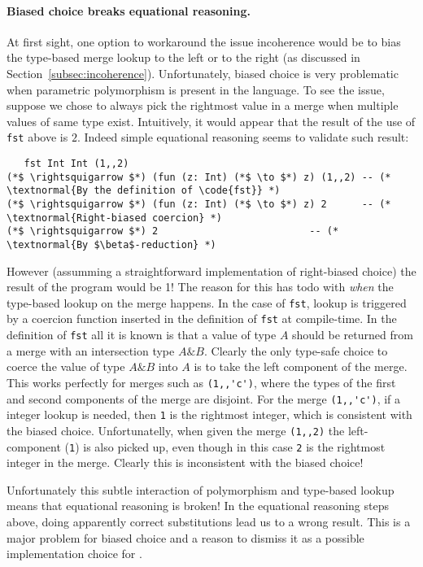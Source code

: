 \paragraph{Biased choice breaks equational reasoning.} At first sight, one option
to workaround the issue incoherence would be to bias the type-based merge lookup
to the left or to the right (as discussed in
Section~\ref{subsec:incoherence}). Unfortunately, biased choice is
very problematic when parametric polymorphism is present in the language.
To see the issue, suppose we chose to always pick the
rightmost value in a merge when multiple values of same type exist.
Intuitively, it would appear that the result of the use of
\lstinline{fst} above is $2$. Indeed simple equational reasoning
seems to validate such result:
\begin{lstlisting}
   fst Int Int (1,,2)
(*$ \rightsquigarrow $*) (fun (z: Int) (*$ \to $*) z) (1,,2) -- (* \textnormal{By the definition of \code{fst}} *)
(*$ \rightsquigarrow $*) (fun (z: Int) (*$ \to $*) z) 2      -- (* \textnormal{Right-biased coercion} *)
(*$ \rightsquigarrow $*) 2                          -- (* \textnormal{By $\beta$-reduction} *)
\end{lstlisting}

However (assumming a straightforward implementation of right-biased
choice) the result of the program would be 1! The reason for this has
todo with \emph{when} the type-based lookup on the merge happens. In
the case of \lstinline{fst}, lookup is triggered by a coercion
function inserted in the definition of \lstinline{fst} at
compile-time.
In the definition of \lstinline$fst$ all it is known is that a
value of type $A$ should be returned from a merge with an intersection
type $A\&B$.  Clearly the only type-safe choice to coerce the value of
type $A\&B$ into $A$ is to
take the left component of the merge. This works perfectly for merges
such as \lstinline$(1,,'c')$, where the types of the first and second components
of the merge are disjoint. For the merge \lstinline$(1,,'c')$, if a integer lookup
is needed, then \lstinline$1$ is the rightmost integer, which is consistent with the
biased choice. Unfortunatelly, when given the merge \lstinline$(1,,2)$ the
left-component (\lstinline$1$) is also picked up, even though in this case \lstinline$2$
is the rightmost integer in the merge. Clearly this is inconsistent
with the biased choice!

Unfortunately this subtle interaction of polymorphism and type-based lookup
 means that equational reasoning is broken!
In the equational reasoning steps above, doing apparently correct
substitutions lead us to a wrong result. This is a major problem for
biased choice and a reason to dismiss it as a possible implementation
choice for \namedis.

